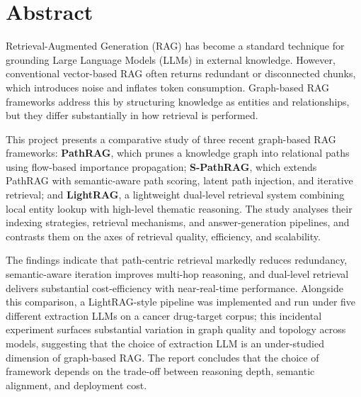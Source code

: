 \documentclass[12pt,a4paper,oneside]{report}
\begin{document}
\tableofcontents
\clearpage

\listoffigures
\clearpage

\listoftables
\clearpage

\pagestyle{fancy}
\setcounter{page}{1}

\chapter{Abstract}
\label{ch:abstract}

Retrieval-Augmented Generation (RAG) has become a standard technique for
grounding Large Language Models (LLMs) in external knowledge. However,
conventional vector-based RAG often returns redundant or disconnected chunks,
which introduces noise and inflates token consumption. Graph-based RAG
frameworks address this by structuring knowledge as entities and relationships,
but they differ substantially in how retrieval is performed.

This project presents a comparative study of three recent graph-based RAG
frameworks: \textbf{PathRAG}, which prunes a knowledge graph into relational
paths using flow-based importance propagation; \textbf{S-PathRAG}, which
extends PathRAG with semantic-aware path scoring, latent path injection, and
iterative retrieval; and \textbf{LightRAG}, a lightweight dual-level retrieval
system combining local entity lookup with high-level thematic reasoning. The
study analyses their indexing strategies, retrieval mechanisms, and
answer-generation pipelines, and contrasts them on the axes of retrieval
quality, efficiency, and scalability.

The findings indicate that path-centric retrieval markedly reduces redundancy,
semantic-aware iteration improves multi-hop reasoning, and dual-level
retrieval delivers substantial cost-efficiency with near-real-time performance.
Alongside this comparison, a LightRAG-style pipeline was implemented and
run under five different extraction LLMs on a cancer drug-target corpus;
this incidental experiment surfaces substantial variation in graph
quality and topology across models, suggesting that the choice of
extraction LLM is an under-studied dimension of graph-based RAG.
The report concludes that the choice of framework depends on the trade-off
between reasoning depth, semantic alignment, and deployment cost.
\end{document}
